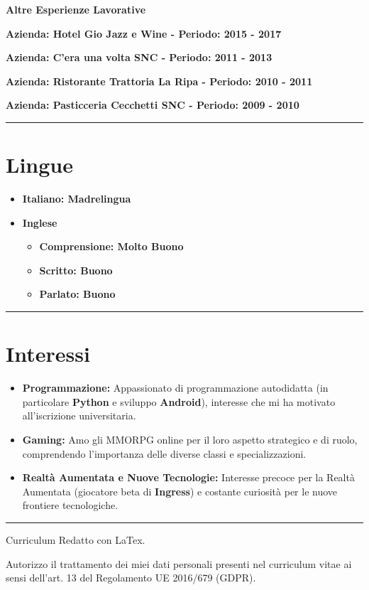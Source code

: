 \documentclass{article}
\newenvironment{listaIdentazione}[1]{
			\begin{list}{}{
			  \setlength{\leftmargin}{#1} %
			  \setlength{\itemsep}{0pt}	%
			  \setlength{\parskip}{0pt} %
			  \setlength{\parsep}{0pt} %
			  \setlength{\labelwidth}{0pt} %
			  \setlength{\labelsep}{0pt} %
			  \renewcommand{\makelabel}[1]{} %
			  }
			}{\end{list}}
\newcommand{\spaziocorto}{\\[0.1cm]}
\newcommand{\spaziopiulungo}{\\[0.8cm]}
\begin{document}
\begin{flushleft}
		\textbf{\Large{Altre Esperienze Lavorative}}
			\spaziocorto
			\begin{listaIdentazione}{0.5cm}
			\item {\textbf{\Large{Azienda: Hotel Gio Jazz e Wine - Periodo: 2015 - 2017}}}
			\spaziocorto
			\item {\textbf{\Large{Azienda: C'era una volta SNC - Periodo: 2011 - 2013}}}
			\spaziocorto
			\item {\textbf{\Large{Azienda: Ristorante Trattoria La Ripa - Periodo: 2010 - 2011}}}
			\spaziocorto
			\item {\textbf{\Large{Azienda: Pasticceria Cecchetti SNC - Periodo: 2009 - 2010}}}
			\spaziopiulungo
			\end{listaIdentazione}

\end{flushleft}

\hrule

\section*{\LARGE{Lingue}}
	\begin{itemize}
	  \item {\Large{\textbf{Italiano: Madrelingua}}}
	  \vspace {0.2cm}
	  \item {\Large{\textbf{Inglese}}}
	  \begin{itemize}
	    \item {\Large{\textbf{Comprensione: Molto Buono}}}
	    \item {\Large{\textbf{Scritto: Buono}}}
	    \item {\Large{\textbf{Parlato: Buono}}}
	    \end{itemize}
	\end{itemize}
	
\hrule

\section*{\LARGE{Interessi}}
	\begin{itemize}
	\item \Large{\textbf{Programmazione:} Appassionato di programmazione autodidatta (in particolare \textbf{Python}
	e sviluppo \textbf{Android}), interesse che mi ha motivato all'iscrizione universitaria.}
  	\item \Large{\textbf{Gaming:} Amo gli MMORPG online per il loro aspetto strategico e di ruolo, comprendendo l'importanza delle diverse classi e specializzazioni.}
  	\item \Large{\textbf{Realtà Aumentata e Nuove Tecnologie:} Interesse precoce per la Realtà Aumentata 
  	(giocatore beta di \textbf{Ingress}) e costante curiosità per le nuove frontiere tecnologiche.}
	\end{itemize}

\hrule

\vspace{0.2cm}
\normalsize
\begin{center}
Curriculum Redatto con LaTex.
\end{center}

\vspace{1cm}
\normalsize
Autorizzo il trattamento dei miei dati personali presenti nel curriculum vitae ai sensi dell’art. 13 del Regolamento UE 2016/679 (GDPR).
\end{document}

